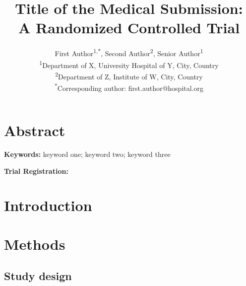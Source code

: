 \documentclass[11pt,a4paper]{article}
\title{Title of the Medical Submission: \\ A Randomized Controlled Trial}
\author{First Author\textsuperscript{1,*}, Second Author\textsuperscript{2}, Senior Author\textsuperscript{1}\\
\textsuperscript{1}Department of X, University Hospital of Y, City, Country\\
\textsuperscript{2}Department of Z, Institute of W, City, Country\\
\textsuperscript{*}Corresponding author: first.author@hospital.org}
\date{}
\begin{document}
\maketitle

\section*{Abstract}

\noindent\textbf{Keywords:} %
keyword one; keyword two; keyword three

\noindent\textbf{Trial Registration:} %

\section{Introduction}
\label{sec:intro}

\section{Methods}
\label{sec:methods}

\subsection{Study design}
\end{document}

